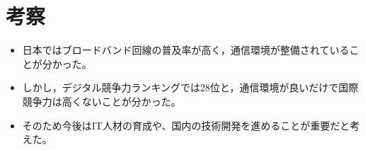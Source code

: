 \documentclass[a4paper,11pt,dvipdfmx]{ujarticle}
\begin{document}

\section{考察}

\begin{itemize}
    \item 日本ではブロードバンド回線の普及率が高く，通信環境が整備されていることが分かった。
    \item しかし，デジタル競争力ランキングでは28位と，通信環境が良いだけで国際競争力は高くないことが分かった。
    \item そのため今後はIT人材の育成や、国内の技術開発を進めることが重要だと考えた。
\end{itemize}
%

%


\end{document}

